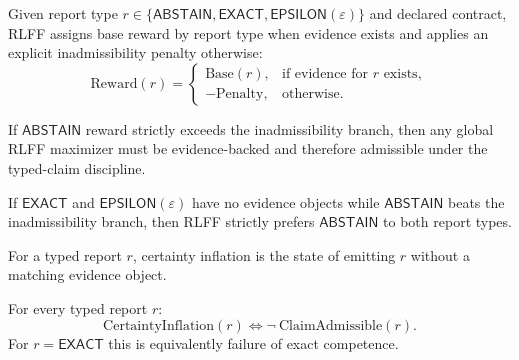 \begin{definition}\label{def:rlff-objective}
Given report type $r\in\{\mathsf{ABSTAIN},\mathsf{EXACT},\mathsf{EPSILON}(\varepsilon)\}$ and declared contract,
RLFF assigns base reward by report type when evidence exists and applies an explicit inadmissibility penalty otherwise:
\[
\mathrm{Reward}(r)=
\begin{cases}
\mathrm{Base}(r), & \text{if evidence for }r\text{ exists},\\
-\mathrm{Penalty}, & \text{otherwise}.
\end{cases}
\]
\end{definition}

\begin{proposition}\label{prop:rlff-maximizer-admissible}
If $\mathsf{ABSTAIN}$ reward strictly exceeds the inadmissibility branch, then any global RLFF maximizer must be evidence-backed and therefore admissible under the typed-claim discipline.
\end{proposition}

\begin{corollary}\label{cor:rlff-abstain-no-certs}
If $\mathsf{EXACT}$ and $\mathsf{EPSILON}(\varepsilon)$ have no evidence objects while $\mathsf{ABSTAIN}$ beats the inadmissibility branch, then RLFF strictly prefers $\mathsf{ABSTAIN}$ to both report types.
\end{corollary}

\begin{definition}\label{def:certainty-inflation}
For a typed report $r$, certainty inflation is the state of emitting $r$ without a matching evidence object.
\end{definition}

\begin{proposition}\label{prop:certainty-inflation-iff-inadmissible}
For every typed report $r$:
\[
\text{CertaintyInflation}(r)
\iff
\neg\ \text{ClaimAdmissible}(r).
\]
For $r=\mathsf{EXACT}$ this is equivalently failure of exact competence.
\end{proposition}

